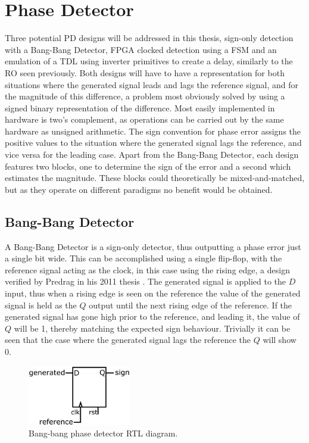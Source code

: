 \section{Phase Detector}
Three potential \acl{PD} designs will be addressed in this thesis, sign-only detection with a Bang-Bang Detector, \ac{FPGA} clocked detection using a \ac{FSM} and an emulation of a \ac{TDL} using inverter primitives to create a delay, similarly to the \ac{RO} seen previously. Both designs will have to have a representation for both situations where the generated signal leads and lags the reference signal, and for the magnitude of this difference, a problem most obviously solved by using a signed binary representation of the difference. Most easily implemented in hardware is two's complement, as operations can be carried out by the same hardware as unsigned arithmetic. The sign convention for phase error assigns the positive values to the situation where the generated signal lags the reference, and vice versa for the leading case. Apart from the Bang-Bang Detector, each design features two blocks, one to determine the sign of the error and a second which estimates the magnitude. These blocks could theoretically be mixed-and-matched, but as they operate on different paradigms no benefit would be obtained.

\subsection{Bang-Bang Detector}
A Bang-Bang Detector is a sign-only detector, thus outputting a phase error just a single bit wide. This can be accomplished using a single flip-flop, with the reference signal acting as the clock, in this case using the rising edge, a design verified by Predrag in his 2011 thesis \cite{redrag}. The generated signal is applied to the $D$ input, thus when a rising edge is seen on the reference the value of the generated signal is held as the $Q$ output until the next rising edge of the reference. If the generated signal has gone high prior to the reference, and leading it, the value of $Q$ will be 1, thereby matching the expected sign behaviour. Trivially it can be seen that the case where the generated signal lags the reference the $Q$ will show 0.
\begin{figure}[h]
	\centering
	\includegraphics[width=0.4\textwidth]{../BB}
	\caption[Bang-bang phase detector \ac{RTL} diagram]{Bang-bang phase detector \ac{RTL} diagram.}
	\label{fig:bang_bang}
\end{figure}

